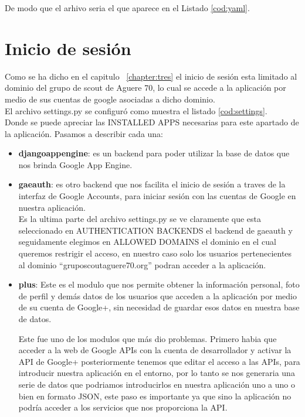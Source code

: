 De modo que el arhivo seria el que aparece en el Listado \ref{cod:yaml}.\\



\section{Inicio de sesión}
\label{4:sec4}

Como se ha dicho en el capitulo ~\ref{chapter:tres} el inicio de sesión esta limitado al dominio del grupo de scout de Aguere 70, lo cual se accede a la aplicación
por medio de sus cuentas de google asociadas a dicho dominio.\\

El archivo settings.py se configuró como muestra el listado \ref{cod:settings}.\\



Donde se puede apreciar las \textsc{INSTALLED APPS} necesarias para este apartado de la aplicación. Pasamos a describir cada una:\\
\begin{itemize}
\item \textbf{djangoappengine}: es un backend para poder utilizar la base de datos que nos brinda Google App Engine.\\

\item \textbf{gaeauth}: es otro backend que nos facilita el inicio de sesión a traves de la interfaz de Google Accounts, 
para iniciar sesión con las cuentas de Google en nuestra aplicación.\\

Es la ultima parte del archivo settings.py se ve claramente que esta seleccionado en \textsc{AUTHENTICATION BACKENDS} el backend de gaeauth y seguidamente elegimos en \textsc{ALLOWED DOMAINS} el dominio
en el cual queremos restrigir el acceso, en nuestro caso solo los usuarios pertenecientes al dominio ``gruposcoutaguere70.org'' podran acceder a la aplicación.

\item \textbf{plus}: Este es el modulo que nos permite obtener la información personal, foto de perfil y demás datos de los usuarios que acceden a la aplicación por medio de su cuenta de Google+, sin necesidad
de guardar esos datos en nuestra base de datos.

Este fue uno de los modulos que más dio problemas. Primero habia que acceder a la web de Google APIs con la cuenta de desarrollador y activar la API de Google+ posteriormente tenemos que editar el acceso a las APIs,
para introducir nuestra aplicación en el entorno, por lo tanto se nos generaria una serie de datos que podriamos introducirlos en nuestra aplicación uno a uno o bien en formato JSON, este paso es importante ya que sino la aplicación
no podría acceder a los servicios que nos proporciona la API.\\

\end{itemize}

